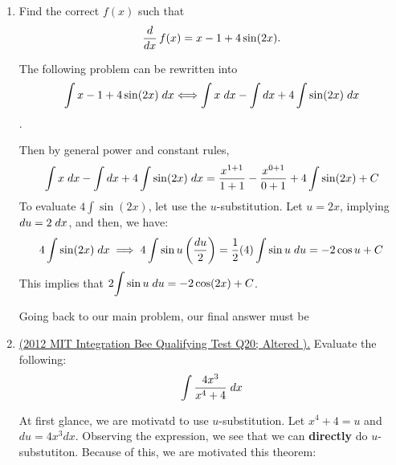 \documentclass[10pt,paper=letter]{scrartcl}
\begin{document}
\begin{enumerate}[resume, label=\arabic*.,font=\bfseries]
\item Find the correct $f(x)$ such that $$\frac{d}{dx}\, f(x) =x-1+4\sin(2x).$$


\sol The following problem can be rewritten into $$\int x-1+4\sin(2x) \hspace{1mm} dx \Longleftrightarrow \int x \hspace{1mm} dx - \int dx + 4\int \sin(2x) \hspace{1mm} dx $$.

Then by general power and constant rules, $$\int x \hspace{1mm} dx - \int dx + 4\int \sin(2x) \hspace{1mm} dx = \dfrac{x^{1+1}}{1+1}- \dfrac{x^{0+1}}{0+1} +  4\int \sin(2x) + C$$ To evaluate $\displaystyle{4\int \sin(2x)}$, let use the $u$-substitution. Let $u=2x$, implying $du=2 \hspace{1mm} dx$, and then, we have: $$4\int \sin(2x) \hspace{1mm} dx \implies 4\int \sin u \left(\dfrac{du}{2}\right) = \dfrac{1}{2} (4)\int \sin u \hspace{1mm} du = -2\cos u + C  $$ This implies that  $2\displaystyle{\int \sin u \hspace{1mm} du = -2\cos (2x) + C  }$.

\vspace{2mm}

Going back to our main problem, our final answer must be 



\item \textsf{\href{http://web.mit.edu/abhinavk/www/integrationbee/qual2012.pdf}{(2012 MIT Integration Bee Qualifying Test Q20; Altered ).}} Evaluate the following: $$\int \dfrac{4x^3}{x^4 +4} \hspace{1mm} dx$$

\vspace{-3mm}


 At first glance, we are motivatd to use $u$-substitution. Let $x^4 + 4 = u$ and $du = 4x^3 dx.$ Observing the expression, we see that we can \textbf{directly} do $u$- substutiton. Because of this, we are motivated this theorem:


\newpage


\end{enumerate}
\end{document}
